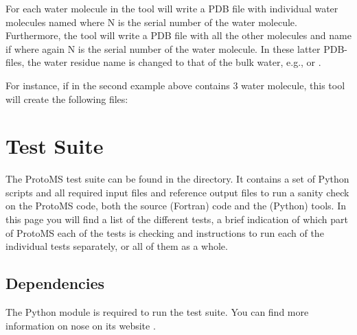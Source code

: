 \documentclass[letterpaper,10pt,english]{sphinxmanual}
\begin{document}
For each water molecule in  the tool will write a PDB file with individual water molecules named  where N is the serial number of the water molecule. Furthermore, the tool will write a PDB file with all the other molecules and name if  where again N is the serial number of the water molecule. In these latter PDB-files, the water residue name is changed to that of the bulk water, e.g.,  or .

For instance, if  in the second example above contains 3 water molecule, this tool will create the following files:

%
\begin{sphinxVerbatim}[commandchars=\\\{\}]

\end{sphinxVerbatim}


\chapter{Test Suite}
\label{\detokenize{testsuite:test-suite}}\label{\detokenize{testsuite::doc}}
The ProtoMS test suite can be found in the  directory. It contains a set of Python scripts and all required input files and reference output files to run a sanity check on the ProtoMS code, both the source (Fortran) code and the (Python) tools. In this page you will find a list of the different tests, a brief indication of which part of ProtoMS each of the tests is checking and instructions to run each of the individual tests separately, or all of them as a whole.


\section{Dependencies}
\label{\detokenize{testsuite:dependencies}}
The Python module  is required to run the test suite. You can find more information on nose on its website .
\end{document}
